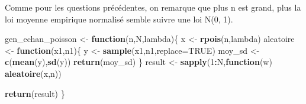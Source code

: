 \documentclass[]{article}
\newenvironment{Shaded}{\begin{snugshade}}{\end{snugshade}}
\newcommand{\ControlFlowTok}[1]{\textcolor[rgb]{0.13,0.29,0.53}{\textbf{#1}}}
\newcommand{\DataTypeTok}[1]{\textcolor[rgb]{0.13,0.29,0.53}{#1}}
\newcommand{\DecValTok}[1]{\textcolor[rgb]{0.00,0.00,0.81}{#1}}
\newcommand{\KeywordTok}[1]{\textcolor[rgb]{0.13,0.29,0.53}{\textbf{#1}}}
\newcommand{\NormalTok}[1]{#1}
\newcommand{\OperatorTok}[1]{\textcolor[rgb]{0.81,0.36,0.00}{\textbf{#1}}}
\newcommand{\OtherTok}[1]{\textcolor[rgb]{0.56,0.35,0.01}{#1}}
\newcommand{\StringTok}[1]{\textcolor[rgb]{0.31,0.60,0.02}{#1}}
\begin{document}
Comme pour les questions précédentes, on remarque que plus n est grand,
plus la loi moyenne empirique normalisé semble suivre une loi N(0, 1).

\begin{Shaded}
\begin{Highlighting}[]
\NormalTok{gen_echan_poisson <-}\StringTok{ }\ControlFlowTok{function}\NormalTok{(n,N,lambda)\{}
\NormalTok{    x <-}\StringTok{ }\KeywordTok{rpois}\NormalTok{(n,lambda)}
\NormalTok{    aleatoire <-}\StringTok{ }\ControlFlowTok{function}\NormalTok{(x1,n1)\{}
\NormalTok{      y <-}\StringTok{ }\KeywordTok{sample}\NormalTok{(x1,n1,}\DataTypeTok{replace=}\OtherTok{TRUE}\NormalTok{)}
\NormalTok{      moy_sd <-}\StringTok{ }\KeywordTok{c}\NormalTok{(}\KeywordTok{mean}\NormalTok{(y),}\KeywordTok{sd}\NormalTok{(y))}
     \KeywordTok{return}\NormalTok{(moy_sd)}
\NormalTok{    \}}
\NormalTok{  result <-}\StringTok{ }\KeywordTok{sapply}\NormalTok{(}\DecValTok{1}\OperatorTok{:}\NormalTok{N,}\ControlFlowTok{function}\NormalTok{(w) }\KeywordTok{aleatoire}\NormalTok{(x,n))}
  
  \KeywordTok{return}\NormalTok{(result)}
\NormalTok{\}}


\end{Highlighting}
\end{Shaded}
\end{document}

